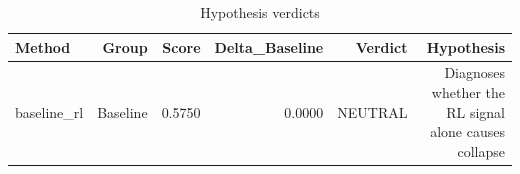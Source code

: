 \begin{table}[htbp]
\centering
\caption{Hypothesis verdicts}
\label{tab:hyp-verdicts}
\begin{tabular}{lrrrrr}
\toprule
\textbf{Method} & \textbf{Group} & \textbf{Score} & \textbf{Delta\_Baseline} & \textbf{Verdict} & \textbf{Hypothesis} \\
\midrule
baseline\_rl & Baseline & 0.5750 & 0.0000 & NEUTRAL & Diagnoses whether the RL signal alone causes collapse \\
\bottomrule
\end{tabular}
\end{table}